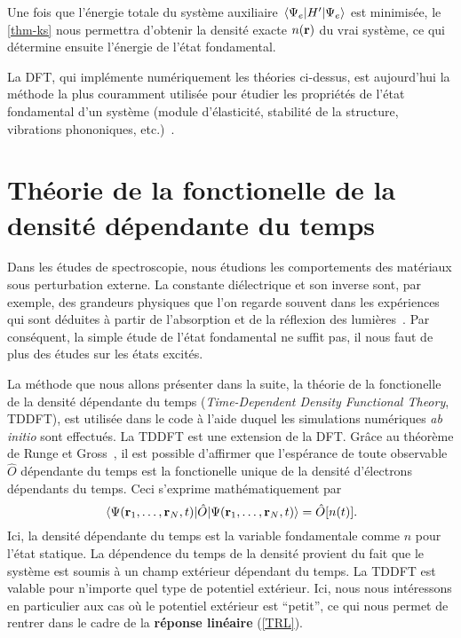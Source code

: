 Une fois que l'énergie totale du système auxiliaire $\ev{H'}{\Psi_e}$ est minimisée,
le \cref{thm-ks} nous permettra d'obtenir la densité exacte $n(\vb{r})$ du vrai système,
ce qui détermine ensuite l'énergie de l'état fondamental.

La DFT, qui implémente numériquement les théories ci-dessus,
est aujourd'hui la méthode la plus couramment utilisée pour étudier
les propriétés de l'état fondamental d'un système
(module d'élasticité, stabilité de la structure, vibrations phononiques, etc.)~\cite{Martin2004}.

\section[TDDFT]{Théorie de la fonctionelle de la densité dépendante du temps}
\label{sec-TDDFT}
Dans les études de spectroscopie,
nous étudions les comportements des matériaux sous perturbation externe.
La constante diélectrique et son inverse sont, par exemple,
des grandeurs physiques que l'on regarde souvent dans les expériences
qui sont déduites à partir de l'absorption et de la réflexion des lumières~\cite{Sottile2003}.
Par conséquent, la simple étude de l'état fondamental ne suffit pas,
il nous faut de plus des études sur les états excités.

La méthode que nous allons présenter dans la suite,
la théorie de la fonctionelle de la densité dépendante du temps
(\textit{Time-Dependent Density Functional Theory}, TDDFT),
est utilisée dans le code à l'aide duquel les simulations numériques \textit{ab initio} sont effectués.
La TDDFT est une extension de la DFT\@.
Grâce au théorème de Runge et Gross~\cite{Runge1984},
il est possible d'affirmer que l'espérance de toute observable $\hat{O}$ dépendante du temps
est la fonctionelle unique de la densité d'électrons dépendants du temps.
Ceci s'exprime mathématiquement par
\begin{equation}
  \ev{\hat{O}}{\Psi(\vb{r}_1, \ldots, \vb{r}_N, t)} = \hat{O}[n(t)].
\end{equation}
Ici, la densité dépendante du temps est la variable fondamentale comme $n$ pour l'état statique.
La dépendence du temps de la densité provient du fait que le système est soumis à un champ extérieur dépendant du temps.
La TDDFT est valable pour n'importe quel type de potentiel extérieur.
Ici, nous nous intéressons en particulier aux cas où le potentiel extérieur est ``petit'',
ce qui nous permet de rentrer dans le cadre de la \textbf{réponse linéaire} (\cref{TRL}).

